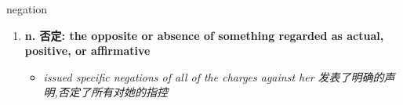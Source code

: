 
\begin{frame}
{\huge negation}
\begin{center}
\begin{enumerate}\Large
  \item \textbf{n. 否定: the opposite or absence of something regarded as actual, positive, or affirmative}
  \begin{itemize}
    \item \em{\Large{issued specific negations of all of the charges against her 发表了明确的声明,否定了所有对她的指控}}
  \end{itemize}
\end{enumerate}
\end{center}
\end{frame}
